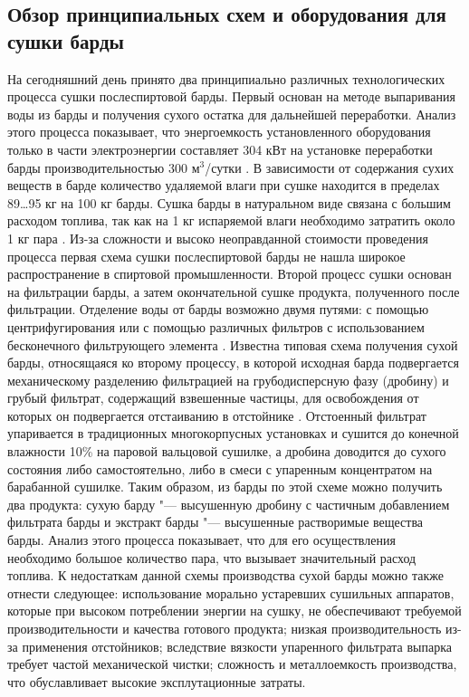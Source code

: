%
\subsection{Обзор принципиальных схем и оборудования для сушки барды} 

На сегодняшний день принято два принципиально различных технологических процесса сушки послеспиртовой барды. 
Первый основан на методе выпаривания воды из барды и получения сухого остатка для дальнейшей переработки. 
Анализ этого процесса показывает, что энергоемкость установленного оборудования только в части электроэнергии составляет 304 кВт на установке переработки барды производительностью 300 м$^{3}$/сутки \cite{Ryabov_2003_6_Journal}. 
В зависимости от содержания сухих веществ в барде количество удаляемой влаги при сушке находится в пределах 89\dots95 кг на 100 кг барды. 
Сушка барды в натуральном виде связана с большим расходом топлива, так как на 1 кг испаряемой влаги необходимо затратить около 1 кг пара \cite{Denshikov_1963,Hug_1987_Journal}. 
Из-за сложности и высоко неоправданной стоимости проведения процесса первая схема сушки послеспиртовой барды не нашла широкое распространение в спиртовой промышленности. 
Второй процесс сушки основан на фильтрации барды, а затем окончательной сушке продукта, полученного после фильтрации. 
Отделение воды от барды возможно двумя путями: с помощью центрифугирования или с помощью различных фильтров с использованием бесконечного фильтрующего элемента \cite{Antipov_2005_2_Journal}. 
Известна типовая схема получения сухой барды, относящаяся ко второму процессу, в которой исходная барда подвергается механическому разделению фильтрацией на грубодисперсную фазу (дробину) и грубый фильтрат, содержащий взвешенные частицы, для освобождения от которых он подвергается отстаиванию в отстойнике \cite{Denshikov_1963}. 
Отстоенный фильтрат упаривается в традиционных многокорпусных установках и сушится до конечной влажности 10\% на паровой вальцовой сушилке, а дробина доводится до сухого состояния либо самостоятельно, либо в смеси с упаренным концентратом на барабанной сушилке. 
Таким образом, из барды по этой схеме можно получить два продукта: сухую барду "--- высушенную дробину с частичным добавлением фильтрата барды и экстракт барды "--- высушенные растворимые вещества барды. 
Анализ этого процесса показывает, что для его осуществления необходимо большое количество пара, что вызывает значительный расход топлива. 
К недостаткам данной схемы производства сухой барды можно также отнести следующее: использование морально устаревших сушильных аппаратов, которые при высоком потреблении энергии на сушку, не обеспечивают требуемой производительности и качества готового продукта; низкая производительность из-за применения отстойников; вследствие вязкости упаренного фильтрата выпарка требует частой механической чистки; сложность и металлоемкость производства, что обуславливает высокие эксплутационные затраты. 
